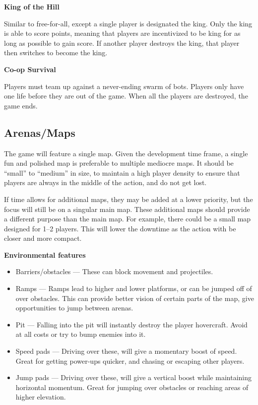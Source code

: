\documentclass{article}
\theoremstyle{definition}
\begin{document}
\textbf{\textbf{King of the Hill}}

Similar to free-for-all, except a single player is designated the king. Only
the king is able to score points, meaning that players are incentivized to be
king for as long as possible to gain score. If another player destroys the
king, that player then switches to become the king.

\textbf{Co-op Survival}

Players must team up against a never-ending swarm of bots. Players only have
one life before they are out of the game. When all the players are destroyed,
the game ends.
\subsection{Arenas/Maps}

The game will feature a single map. Given the development time frame, a single
fun and polished map is preferable to multiple mediocre maps. It should be
``small'' to ``medium'' in size, to maintain a high player density to ensure
that players are always in the middle of the action, and do not get lost.


If time allows for additional maps, they may be added at a lower priority, but
the focus will still be on a singular main map. These additional maps should
provide a different purpose than the main map. For example, there could be
a small map designed for 1--2 players. This will lower the downtime as the
action with be closer and more compact.

\textbf{Environmental features}

\begin{itemize}
  \item Barriers/obstacles --- These can block movement and projectiles.
  \item Ramps --- Ramps lead to higher and lower platforms, or can be jumped
    off of over obstacles. This can provide better vision of certain parts of
    the map, give opportunities to jump between arenas.
  \item Pit --- Falling into the pit will instantly destroy the player
    hovercraft. Avoid at all costs or try to bump enemies into it.
  \item Speed pads --- Driving over these, will give a momentary boost of
    speed. Great for getting power-ups quicker, and chasing or escaping other
    players.
  \item Jump pads --- Driving over these, will give a vertical boost while
    maintaining horizontal momentum. Great for jumping over obstacles or
    reaching areas of higher elevation. %
\end{itemize}
\end{document}
